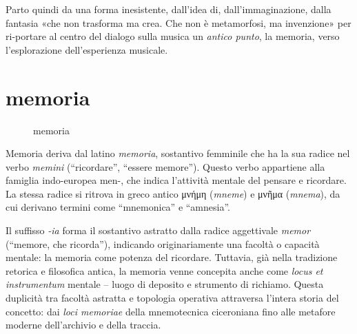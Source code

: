 Parto quindi da una forma inesistente, dall'idea di, dall'immaginazione, dalla fantasia «che non trasforma ma crea. Che non è metamorfosi, ma invenzione» per ri-portare al centro del dialogo sulla musica un \emph{antico punto}, la memoria, verso l'esplorazione dell'esperienza musicale.

\section{memoria}

\begin{figure}[h]
\begin{center}
\caption{memoria}
\label{slide2}
\end{center}
\end{figure}

Memoria deriva dal latino \emph{memoria}, sostantivo femminile che ha la sua radice nel verbo \emph{memini} (“ricordare”, “essere memore”). Questo verbo appartiene alla famiglia indo-europea {\phonfont *men-}, che indica l'attività mentale del pensare e ricordare. La stessa radice si ritrova in greco antico \textgreek{μνήμη} (\emph{mneme}) e \textgreek{μνῆμα} (\emph{mnema}), da cui derivano termini come “mnemonica” e “amnesia”.

Il suffisso \emph{-ia} forma il sostantivo astratto dalla radice aggettivale \emph{memor} (“memore, che ricorda”), indicando originariamente una facoltà o capacità mentale: la memoria come potenza del ricordare. Tuttavia, già nella tradizione retorica e filosofica antica, la memoria venne concepita anche come \emph{locus et instrumentum} mentale – luogo di deposito e strumento di richiamo. Questa duplicità tra facoltà astratta e topologia operativa attraversa l'intera storia del concetto: dai \emph{loci memoriae} della mnemotecnica ciceroniana fino alle metafore moderne dell'archivio e della traccia.


